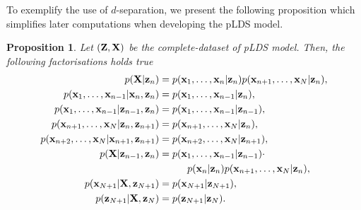 \documentclass[11pt]{article}
\numberwithin{equation}{section}
\newcommand{\x}{{\bf x}}
\newcommand{\z}{{\bf z}}
\newtheorem{proposition}{Proposition}[section]
\begin{document}

To exemplify the use of $d$-separation, we present the following proposition which simplifies later computations when developing the pLDS model.

\begin{proposition} \label{prop:graphical-models-separation}
	Let $({\bf Z}, {\bf X})$ be the complete-dataset of pLDS model. Then, the following factorisations holds true
	\begin{align}
		p({\bf X}\vert\z_n) &= p({\x_1, \ldots, \x_n \vert \z_n})p({\x_{n+1}, \ldots, \x_N \vert \z_n}), \label{eq:gm-1}\\
		p(\x_1, \ldots, \x_{n-1}\vert \x_n, \z_n) &= p(\x_1, \ldots, \x_{n-1}\vert \z_n), \label{eq:gm-2}\\
		p(\x_1, \ldots, \x_{n-1}\vert \z_{n-1}, \z_{n}) &= p(\x_1, \ldots, \x_{n-1}\vert \z_{n-1}), \label{eq:gm-3}\\
		p(\x_{n+1}, \ldots, \x_N \vert \z_n, \z_{n+1}) &= p(\x_{n+1}, \ldots, \x_N \vert \z_n), \label{eq:gm-4}\\
		p(\x_{n+2}, \ldots, \x_N\vert \x_{n+1}, \z_{n+1}) &= p(\x_{n+2}, \ldots, \x_N \vert \z_{n+1}),\label{eq:gm-5}\\
		p({\bf X}\vert \z_{n-1}, \z_{n}) &= p(\x_1, \ldots, \x_{n-1}\vert \z_{n-1})\cdot \nonumber\\
			&\hspace{1cm}p(\x_n\vert \z_n) p(\x_{n+1}, \ldots, \x_N \vert \z_n), \label{eq:gm-6}\\
		p(\x_{N+1} \vert {\bf X}, \z_{N+1}) &= p(\x_{N+1} \vert \z_{N+1}), \label{eq:gm-7}\\
		p(\z_{N+1} \vert {\bf X}, \z_{N}) &= p(\z_{N+1} \vert \z_{N}). \label{eq:gm-8}\\
	\end{align}
\end{proposition}
\end{document}
